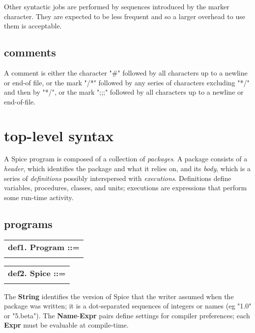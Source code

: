 \documentclass{report}
\begin{document}
Other syntactic jobs are performed by sequences introduced by the marker
character. They are expected to be less frequent and so a larger overhead
to use them is acceptable.

\section{comments}


A comment is either the character "\#"
followed by all characters up to a newline or
end-of file, or the mark "/*" followed by any series of characters excluding
"*/" and then by "*/", or the mark ";;;" followed by all characters up to a
newline or end-of-file.\chapter{top-level syntax}


A Spice program is composed of a collection of {\em packages}. A package
consists of a {\em header}, which identifies the package and what it relies
on, and its {\em body}, which is a series of {\em definitions} possibly
interspersed with {\em executions}. Definitions define variables,
procedures, classes, and units; executions are expressions
that perform some run-time activity.

\section{programs}


\begin{tabular}{l}
{\bf def1. Program ::= }\\ 
\hspace*{3mm}{\tt Spice (Package* $\mid$ PackageBody)} \\ 
\end{tabular}



\begin{tabular}{l}
{\bf def2. Spice ::= }\\ 
\hspace*{3mm}{\tt "spice" String ("," (Name ":" Expr))*} \\ 
\end{tabular}



The {\bf String} identifies the version of Spice that the writer assumed
when the package was written; it is a dot-separated sequences of
integers or names (eg "1.0" or "5.beta"). The {\bf Name}-{\bf Expr} pairs
define settings for compiler preferences; each {\bf Expr} must be
evaluable at compile-time.
\end{document}

